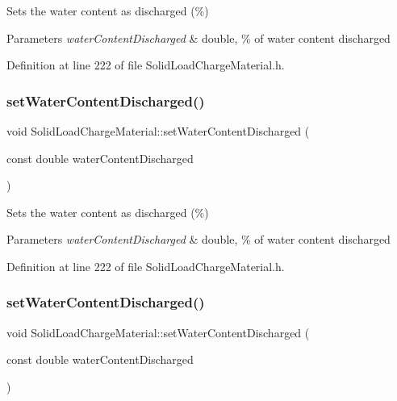 Sets the water content as discharged (\%) 
\begin{DoxyParams}{Parameters}
{\em water\+Content\+Discharged} & double, \% of water content discharged \\
\hline
\end{DoxyParams}


Definition at line 222 of file Solid\+Load\+Charge\+Material.\+h.

\mbox{\label{class_solid_load_charge_material_a5104ddb43af977a751b90a0bc844d83d}} 
\subsubsection{\texorpdfstring{set\+Water\+Content\+Discharged()}{setWaterContentDischarged()}\hspace{0.1cm}{\footnotesize\ttfamily [2/3]}}
{\footnotesize\ttfamily void Solid\+Load\+Charge\+Material\+::set\+Water\+Content\+Discharged (\begin{DoxyParamCaption}\item[{const double}]{water\+Content\+Discharged }\end{DoxyParamCaption})\hspace{0.3cm}{\ttfamily [inline]}}

Sets the water content as discharged (\%) 
\begin{DoxyParams}{Parameters}
{\em water\+Content\+Discharged} & double, \% of water content discharged \\
\hline
\end{DoxyParams}


Definition at line 222 of file Solid\+Load\+Charge\+Material.\+h.

\mbox{\label{class_solid_load_charge_material_a5104ddb43af977a751b90a0bc844d83d}} 
\subsubsection{\texorpdfstring{set\+Water\+Content\+Discharged()}{setWaterContentDischarged()}\hspace{0.1cm}{\footnotesize\ttfamily [3/3]}}
{\footnotesize\ttfamily void Solid\+Load\+Charge\+Material\+::set\+Water\+Content\+Discharged (\begin{DoxyParamCaption}\item[{const double}]{water\+Content\+Discharged }\end{DoxyParamCaption})\hspace{0.3cm}{\ttfamily [inline]}}

